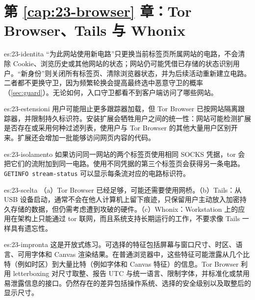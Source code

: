 \section*{第 \ref{cap:23-browser} 章：Tor Browser、Tails 与 Whonix}

\begin{soluzione}{es:23-identita}
\enquote{为此网站使用新电路}只更换当前标签页所属网站的电路，不会清除 Cookie、浏览历史或其他网站的状态；网站仍可能凭借已存储的状态识别用户。\enquote{新身份}则关闭所有标签页、清除浏览器状态，并为后续活动重新建立电路。二者都不更换守卫，因为频繁轮换会提高最终选中恶意守卫的概率（\cref{sec:guard}）。无论如何，入口守卫都看不到客户端访问了哪些网站。
\end{soluzione}

\begin{soluzione}{es:23-estensioni}
用户可能阻止更多跟踪器加载，但 Tor Browser 已按网站隔离跟踪器，并限制持久标识符。安装扩展会牺牲用户之间的统一性：网站可能检测扩展是否存在或采用何种过滤列表，使用户与 Tor Browser 的其他大量用户区别开来。扩展还会增加一批能够访问网页内容的代码。
\end{soluzione}

\begin{soluzione}{es:23-isolamento}
如果访问同一网站的两个标签页使用相同 SOCKS 凭据，tor 会把它们的流附加到同一电路。使用不同凭据的第三个标签页会获得另一条电路。\texttt{GETINFO stream-status} 可以显示每条流对应的电路标识符。
\end{soluzione}

\begin{soluzione}{es:23-scelta}
（a）Tor Browser 已经足够，可能还需要使用网桥。（b）Tails：从 USB 设备启动，通常不会在他人计算机上留下痕迹，只保留用户主动放入加密持久存储的数据，但仍需考虑遭到攻破的硬件。（c）Whonix：Workstation 上的应用在架构上只能通过 tor 联网，而且系统支持长期运行的工作，不要求像 Tails 一样具有遗忘性。
\end{soluzione}

\begin{soluzione}{es:23-impronta}
这是开放式练习。可选择的特征包括屏幕与窗口尺寸、时区、语言、可用字体和 Canvas 渲染结果。在普通浏览器中，这些特征可能泄露从几个比特（例如时区）到大量比特（例如字体和 Canvas 特征）的信息。Tor Browser 利用 letterboxing 对尺寸取整、报告 UTC 与统一语言、限制字体，并标准化或禁用易泄露信息的接口。仍然存在的差异包括操作系统、选择的安全级别以及取整后的显示尺寸。
\end{soluzione}

